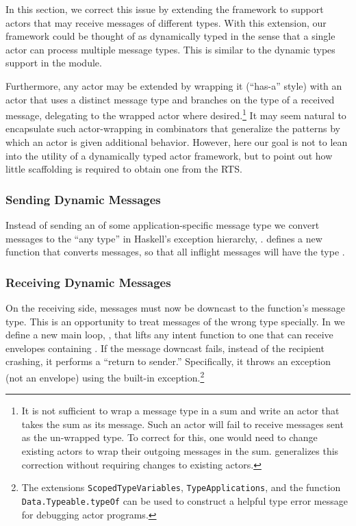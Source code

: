\documentclass[sigplan,screen]{acmart}
\begin{document}
In this section, we correct this issue by extending the framework to support
actors that may receive messages of different types.
%
With this extension, our framework could be thought of as dynamically typed in
the sense that a single actor can process multiple message types.
%
This is similar to the dynamic types support in the
 module.


Furthermore, any actor may be extended by wrapping it (``has-a'' style) with an
actor that uses a distinct message type and branches on the type of a received
message, delegating to the wrapped actor where desired.\footnote{
    It is not sufficient to wrap a message type in a sum and write an actor
    that takes the sum as its message.
    Such an actor will fail to receive messages sent as the un-wrapped type.
    To correct for this, one would need to change existing actors to wrap their
    outgoing messages in the sum.
     generalizes this
    correction without requiring changes to existing actors.
}
%
It may seem natural to encapsulate such actor-wrapping in combinators that
generalize the patterns by which an actor is given additional behavior.
%
However, here our goal is not to lean into the utility of a dynamically
typed actor framework, but to point out how little scaffolding is required to
obtain one from the RTS.


\subsubsection{Sending Dynamic Messages}


Instead of sending an 
of some application-specific message type
we convert messages to the ``any type''
in Haskell's exception hierarchy,
 \cite{marlow2006extensible}.
%
 defines a new  function that converts messages,
so that all inflight messages will have the type .


\subsubsection{Receiving Dynamic Messages}
\label{sec:dynamic-recv-loop}


On the receiving side, messages must now be downcast to the 
function's message type.
%
This is an opportunity to treat messages of the wrong type specially.
%
In  we define a new main loop, ,
that lifts any intent function to one that can
receive envelopes containing .
%
If the message downcast fails, instead of the recipient crashing, it performs a
``return to sender.''
%
Specifically, it throws an exception (not an envelope) using the built-in
 exception.\footnote{
    The extensions \texttt{ScopedTypeVariables}, \texttt{TypeApplications}, and
    the function \texttt{Data.Typeable.typeOf} can be used to construct a
    helpful type error message for debugging actor programs.
}
\end{document}
